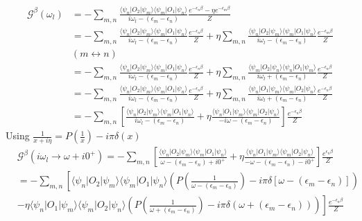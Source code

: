 \documentclass[a4paper,11pt]{article}
\begin{document}
\begin{equation*}
  \begin{split}
     \mathcal{G}^\beta(\omega_l)&=-\sum_{m,n}\frac{\langle\psi_n|O_2|\psi_m\rangle\langle\psi_m|O_1|\psi_n\rangle}{i\omega_l-(\epsilon_m-\epsilon_n)}\frac{e^{-\epsilon_n\beta}-\eta e^{-\epsilon_m\beta}}{Z}\\
       &=-\sum_{m,n}\frac{\langle\psi_n|O_2|\psi_m\rangle\langle\psi_m|O_1|\psi_n\rangle}{i\omega_l-(\epsilon_m-\epsilon_n)}\frac{e^{-\epsilon_n\beta}}{Z}+\eta\sum_{m,n}\frac{\langle\psi_n|O_2|\psi_m\rangle\langle\psi_m|O_1|\psi_n\rangle}{i\omega_l-(\epsilon_m-\epsilon_n)}\frac{e^{-\epsilon_m\beta}}{Z}\\
       &(m\leftrightarrow n)\\
  &=-\sum_{m,n}\frac{\langle\psi_n|O_2|\psi_m\rangle\langle\psi_m|O_1|\psi_n\rangle}{i\omega_l-(\epsilon_m-\epsilon_n)}\frac{e^{-\epsilon_n\beta}}{Z}+\eta\sum_{m,n}\frac{\langle\psi_m|O_2|\psi_n\rangle\langle\psi_n|O_1|\psi_m\rangle}{i\omega_l+(\epsilon_m-\epsilon_n)}\frac{e^{-\epsilon_n\beta}}{Z}\\
  &=-\sum_{m,n}\frac{\langle\psi_n|O_2|\psi_m\rangle\langle\psi_m|O_1|\psi_n\rangle}{i\omega_l-(\epsilon_m-\epsilon_n)}\frac{e^{-\epsilon_n\beta}}{Z}+\eta\sum_{m,n}\frac{\langle\psi_n|O_1|\psi_m\rangle\langle\psi_m|O_2|\psi_n\rangle}{i\omega_l+(\epsilon_m-\epsilon_n)}\frac{e^{-\epsilon_n\beta}}{Z}\\
  &=-\sum_{m,n}\left[\frac{\langle\psi_n|O_2|\psi_m\rangle\langle\psi_m|O_1|\psi_n\rangle}{i\omega_l-(\epsilon_m-\epsilon_n)}+\eta\frac{\langle\psi_n|O_1|\psi_m\rangle\langle\psi_m|O_2|\psi_n\rangle}{-i\omega-(\epsilon_m-\epsilon_n)}\right]\frac{e^{-\epsilon_n\beta}}{Z}
  \end{split}
\end{equation*}
Using $\frac{1}{x+i\eta}=P(\frac{1}{x})-i\pi\delta(x)$
\begin{equation*}
  \begin{split}
     &\mathcal{G}^\beta(i\omega_l\rightarrow\omega+i0^+)=-\sum_{m,n}\left[\frac{\langle\psi_n|O_2|\psi_m\rangle\langle\psi_m|O_1|\psi_n\rangle}{\omega-(\epsilon_m-\epsilon_n)+i0^+}+\eta\frac{\langle\psi_n|O_1|\psi_m\rangle\langle\psi_m|O_2|\psi_n\rangle}{-\omega-(\epsilon_m-\epsilon_n)-i0^+}\right]\frac{e^{\epsilon_n\beta}}{Z}\\
     &=-\sum_{m,n}\left[\langle\psi_n|O_2|\psi_m\rangle\langle\psi_m|O_1|\psi_n\rangle\left(P\left(\frac{1}{\omega-(\epsilon_m-\epsilon_n)}\right)-i\pi\delta[\omega-(\epsilon_m-\epsilon_n)]\right)\right.\\
     &\left.-\eta\langle\psi_n|O_1|\psi_m\rangle\langle\psi_m|O_2|\psi_n\rangle\left(P\left(\frac{1}{\omega+(\epsilon_m-\epsilon_n)}\right)-i\pi\delta(\omega+(\epsilon_m-\epsilon_n))\right)\right]\frac{e^{-\epsilon_n\beta}}{Z}
  \end{split}
\end{equation*}
\end{document}
